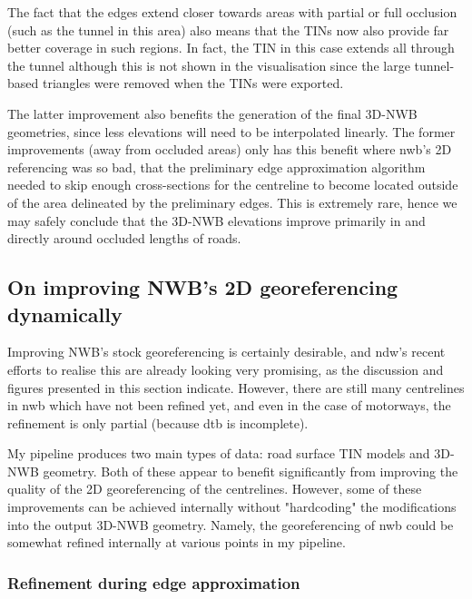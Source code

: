 The fact that the edges extend closer towards areas with partial or full occlusion (such as the tunnel in this area) also means that the TINs now also provide far better coverage in such regions. In fact, the TIN in this case extends all through the tunnel although this is not shown in the visualisation since the large tunnel-based triangles were removed when the TINs were exported.

The latter improvement also benefits the generation of the final 3D-NWB geometries, since less elevations will need to be interpolated linearly. The former improvements (away from occluded areas) only has this benefit where \ac{nwb}'s 2D referencing was so bad, that the preliminary edge approximation algorithm needed to skip enough cross-sections for the centreline to become located outside of the area delineated by the preliminary edges. This is extremely rare, hence we may safely conclude that the 3D-NWB elevations improve primarily in and directly around occluded lengths of roads.

\subsection{On improving NWB's 2D georeferencing dynamically}
\label{sub:nwb_updated_dynamic}

Improving NWB's stock georeferencing is certainly desirable, and \ac{ndw}'s recent efforts to realise this are already looking very promising, as the discussion and figures presented in this section indicate. However, there are still many centrelines in \ac{nwb} which have not been refined yet, and even in the case of motorways, the refinement is only partial (because \ac{dtb} is incomplete).

My pipeline produces two main types of data: road surface TIN models and 3D-NWB geometry. Both of these appear to benefit significantly from improving the quality of the 2D georeferencing of the centrelines. However, some of these improvements can be achieved internally without "hardcoding" the modifications into the output 3D-NWB geometry. Namely, the georeferencing of \ac{nwb} could be somewhat refined internally at various points in my pipeline.

\subsubsection{Refinement during edge approximation}

